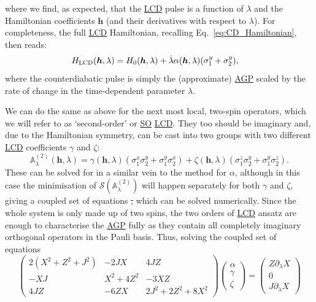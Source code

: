 \documentclass[a4paper,oneside,11pt]{book}
\newcommand{\hbb}{\boldsymbol{h}}
\newcommand{\sx}{\sigma^x}
\newcommand{\sy}{\sigma^y}
\newcommand{\sz}{\sigma^z}
\newcommand{\dlambda}{\partial_{\lambda}}
\newcommand{\dotlambda}{\dot{\lambda}}
\newcommand{\approxAGP}{\mathbb{A}_{\lambda}}
\newcommand{\acrref}[1]{\hyperref[acr:#1]{#1}}
\providecommand{\DIFdeltex}[1]{{\protect\color{red}\sout{#1}}}                      %
\providecommand{\DIFdelbegin}{} %
\providecommand{\DIFdelend}{} %
\providecommand{\DIFdel}[1]{\texorpdfstring{\DIFdeltex{#1}}{}} %
\newcommand{\DIFscaledelfig}{0.5}
\newlength{\DIFdelgraphicswidth} %
\newlength{\DIFdelgraphicsheight} %
\newcommand{\DIFdelincludegraphics}[2][]{%
\sbox{\DIFdelgraphicsbox}{\DIFOincludegraphics[#1]{#2}}%
\settoboxwidth{\DIFdelgraphicswidth}{\DIFdelgraphicsbox} %
\settoboxtotalheight{\DIFdelgraphicsheight}{\DIFdelgraphicsbox} %
\scalebox{\DIFscaledelfig}{%
\parbox[b]{\DIFdelgraphicswidth}{\usebox{\DIFdelgraphicsbox}\\[-\baselineskip] \rule{\DIFdelgraphicswidth}{0em}}\llap{\resizebox{\DIFdelgraphicswidth}{\DIFdelgraphicsheight}{%
\setlength{\unitlength}{\DIFdelgraphicswidth}%
\begin{picture}(1,1)%
\thicklines\linethickness{2pt} %
{\color[rgb]{1,0,0}\put(0,0){\framebox(1,1){}}}%
{\color[rgb]{1,0,0}\put(0,0){\line( 1,1){1}}}%
{\color[rgb]{1,0,0}\put(0,1){\line(1,-1){1}}}%
\end{picture}%
}\hspace*{3pt}}} %
} %
\DeclareRobustCommand{\DIFdelbegin}{\DIFOdelbegin \let\includegraphics\DIFdelincludegraphics} %
\DeclareRobustCommand{\DIFdelend}{\DIFOaddend \let\includegraphics\DIFOincludegraphics} %
\begin{document}
where we find, as expected, that the \acrref{LCD} pulse is a function of $\lambda$ and the Hamiltonian coefficients $\hbb$ (and their derivatives with respect to $\lambda$). For completeness, the full \acrref{LCD} Hamiltonian, recalling Eq.~\eqref{eq:CD_Hamiltonian}, then reads:
\begin{equation}\label{eq:FO_LCD_H}
    \begin{aligned}
        H_{\rm LCD}(\hbb, \lambda) &= H_0(\hbb, \lambda) + \dotlambda \alpha(\hbb, \lambda) (\sy_{1} + \sy_{2}),
    \end{aligned}
\end{equation}
where the counterdiabatic pulse is simply the (approximate) \acrref{AGP} scaled by the rate of change in the time-dependent parameter $\lambda$.

We can do the same as above for the next most local, two-spin operators, which we will refer to as `second-order' or \acrref{SO} \acrref{LCD}. They too should be imaginary and, due to the Hamiltonian symmetry, can be cast into two groups with two different \acrref{LCD} coefficients $\gamma$ and $\zeta$:
\begin{equation}\label{eq:twospin_so_lcd}
        \approxAGP^{(2)}(\hbb, \lambda) = \gamma(\hbb, \lambda) (\sx_1 \sy_2 + \sy_1 \sx_2) + \zeta(\hbb, \lambda) (\sz_1 \sy_2 + \sy_1 \sz_2).
\end{equation}
These can be solved for in a similar vein to the method for $\alpha$, although in this case the minimisation of $\mathcal{S}(\approxAGP^{(2)})$ will happen separately for both $\gamma$ and $\zeta$, giving a coupled set of equations \DIFdelbegin \DIFdel{, }\DIFdelend which can be solved numerically. Since the whole system is only made up of two spins, the two orders of \acrref{LCD} ansatz are enough to characterise the \acrref{AGP} fully as they contain all completely imaginary orthogonal operators in the Pauli basis. Thus, solving the coupled set of equations
\begin{equation}\label{eq:two_spin_coupled_eqs}
        \begin{pmatrix}
        2(X^2 + Z^2 + J^2) & - 2JX & 4JZ \\ 
        -XJ & X^2 + 4Z^2 & -3XZ \\ 
        4JZ & -6ZX & 2J^2 + 2Z^2 + 8X^2
        \end{pmatrix} 
        \begin{pmatrix}
            \alpha \\
            \gamma \\
            \zeta
        \end{pmatrix} = 
        \begin{pmatrix}
            Z \dlambda X \\
            0 \\
            J \dlambda X
        \end{pmatrix}
\end{equation}
\end{document}
